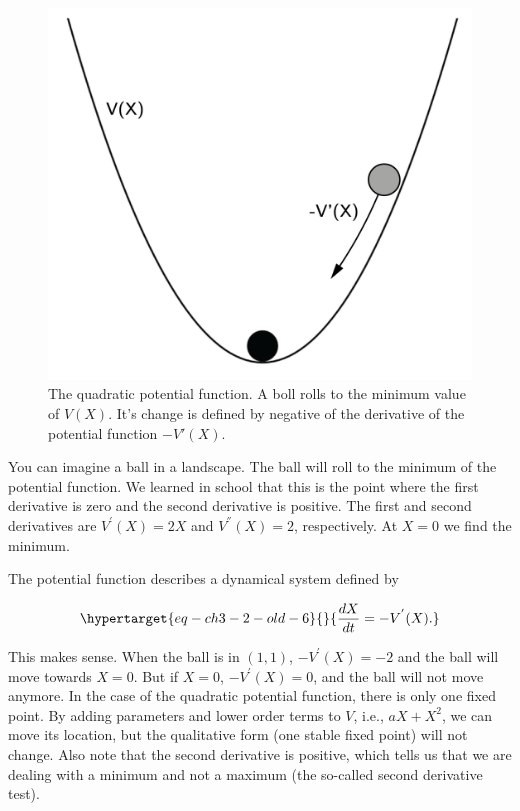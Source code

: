 \documentclass[
  a4paper,
  DIV=11,
  numbers=noendperiod,
  oneside]{scrreprt}
\begin{document}
\begin{figure}

{\centering \includegraphics{media/ch3/ch3-03__figure15.png}

}

\caption{\label{fig-ch3-img3-old-15}The quadratic potential function. A
boll rolls to the minimum value of \(V(X)\). It's change is defined by
negative of the derivative of the potential function \(-V'(X)\).}

\end{figure}

You can imagine a ball in a landscape. The ball will roll to the minimum
of the potential function. We learned in school that this is the point
where the first derivative is zero and the second derivative is
positive. The first and second derivatives are \(V^{'}(X) = 2X\) and
\(V^{''}(X) = 2\), respectively. At \(X = 0\) we find the minimum.

The potential function describes a dynamical system defined by

\begin{equation}\protect\hypertarget{eq-ch3-2-old-6}{}{
\frac{dX}{dt} = - V^{'}(X).
}\label{eq-ch3-2-old-6}\end{equation}

This makes sense. When the ball is in \((1,1)\), \(- V^{'}(X) = - 2\)
and the ball will move towards \(X = 0\). But if \(X = 0\),
\(- V^{'}(X) = 0\), and the ball will not move anymore. In the case of
the quadratic potential function, there is only one fixed point. By
adding parameters and lower order terms to \(V\), i.e.,
\({aX + X}^{2}\), we can move its location, but the qualitative form
(one stable fixed point) will not change. Also note that the second
derivative is positive, which tells us that we are dealing with a
minimum and not a maximum (the so-called second derivative test).
\end{document}
